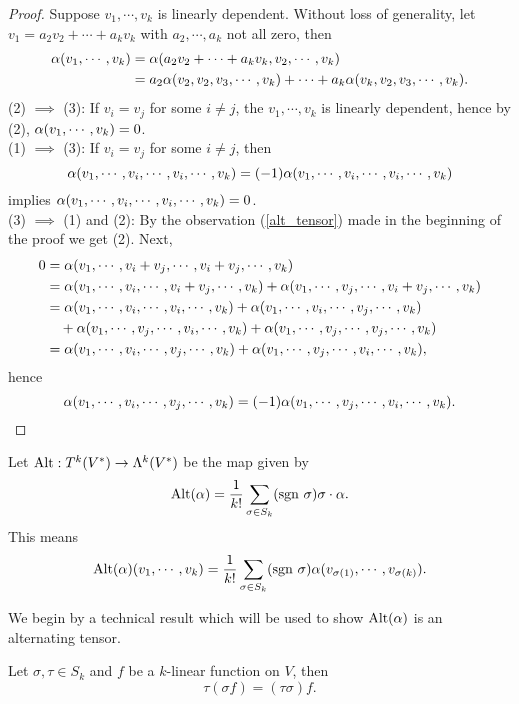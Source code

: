 \begin{proof}
    Suppose $v_1, \cdots, v_k$ is linearly dependent. Without loss of generality, let $v_1 = a_2v_2 + \cdots + a_kv_k$ with $a_2,\cdots,a_k$ not all zero, then 
    \begin{align}\label{alt_tensor}
    \alpha(v_1,\cdots,v_k)
    &= \alpha(a_2v_2 + \cdots + a_kv_k, v_2,\cdots,v_k) \\
    &= a_2 \alpha(v_2,v_2,v_3,\cdots,v_k) + \cdots + a_k \alpha(v_k,v_2,v_3,\cdots,v_k).  
    \end{align}
    (2) $\implies$ (3): If $v_i = v_j$ for some $i \neq j$, the $v_1,\cdots,v_k$ is linearly dependent, hence by (2), $\alpha(v_1,\cdots,v_k)=0$. \\
    (1) $\implies$ (3): If $v_i = v_j$ for some $i \neq j$, then 
    $$\alpha(v_1, \cdots, v_i, \cdots, v_i, \cdots, v_k) = (-1)\alpha(v_1, \cdots, v_i, \cdots, v_i, \cdots, v_k)$$ implies $\alpha(v_1, \cdots, v_i, \cdots, v_i, \cdots, v_k) = 0$. \\
    (3) $\implies$ (1) and (2): By the observation (\ref{alt_tensor}) made in the beginning of the proof we get (2). Next,
    \begin{align*}
    0 &= \alpha(v_1,\cdots,v_i+v_j,\cdots,v_i+v_j,\cdots,v_k) \\
    &= \alpha(v_1,\cdots,v_i,\cdots,v_i+v_j,\cdots,v_k) + 
       \alpha(v_1,\cdots,v_j,\cdots,v_i+v_j,\cdots,v_k) \\
    &= \alpha(v_1,\cdots,v_i,\cdots,v_i,\cdots,v_k) + 
       \alpha(v_1,\cdots,v_i,\cdots,v_j,\cdots,v_k) \\
    &\quad+ \alpha(v_1,\cdots,v_j,\cdots,v_i,\cdots,v_k) +
       \alpha(v_1,\cdots,v_j,\cdots,v_j,\cdots,v_k) \\
    &= \alpha(v_1,\cdots,v_i,\cdots,v_j,\cdots,v_k) + 
       \alpha(v_1,\cdots,v_j,\cdots,v_i,\cdots,v_k),
    \end{align*}
    hence 
    $$\alpha(v_1,\cdots,v_i,\cdots,v_j,\cdots,v_k) = (-1)
      \alpha(v_1,\cdots,v_j,\cdots,v_i,\cdots,v_k). $$
\end{proof}
\begin{definition}
    Let $\mathrm{Alt}: T^k(V^*) \to \Lambda^k(V^*)$ be the map given by 
    $$ \mathrm{Alt}(\alpha) = \frac{1}{k!}\sum_{\sigma \in S_k}(\mathrm{sgn~} \sigma) \sigma \cdot \alpha.$$ This means
    $$\mathrm{Alt}(\alpha)(v_1,\cdots,v_k) = \frac{1}{k!}\sum_{\sigma \in S_k}(\mathrm{sgn~} \sigma) \alpha(v_{\sigma(1)}, \cdots, v_{\sigma(k)}). $$
\end{definition}
We begin by a technical result which will be used to show $\mathrm{Alt}(\alpha)$ is an alternating tensor. 
\begin{proposition}
    Let $\sigma, \tau \in S_k$ and $f$ be a $k$-linear function on $V$, then 
    $$\tau(\sigma f) = (\tau \sigma)f. $$
\end{proposition}
